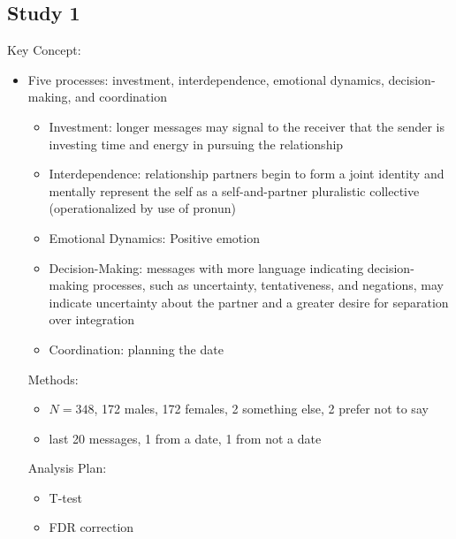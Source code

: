 \subsection{Study 1} 
Key Concept: 
\begin{itemize}
    \item Five processes: investment, interdependence, emotional dynamics, decision-making, and coordination 
        \begin{itemize}
            \item Investment: longer messages may signal to the receiver that the sender is investing time and energy in pursuing the relationship
            \item Interdependence: relationship partners begin to form a joint identity and mentally represent the self as a self-and-partner pluralistic collective (operationalized by use of pronun) 
            \item Emotional Dynamics: Positive emotion 
            \item Decision-Making: messages with more language indicating decision-making processes, such as uncertainty, tentativeness, and negations, may indicate uncertainty about the partner and a greater desire for separation over integration
            \item Coordination: planning the date
        \end{itemize}
Methods: 
    \begin{itemize}
        \item $N = 348$, 172 males, 172 females, 2 something else, 2 prefer not to say 
        \item last 20 messages, 1 from a date, 1 from not a date 
    \end{itemize}
Analysis Plan: 
    \begin{itemize}
        \item T-test 
        \item FDR correction 
    \end{itemize}
\end{itemize}


